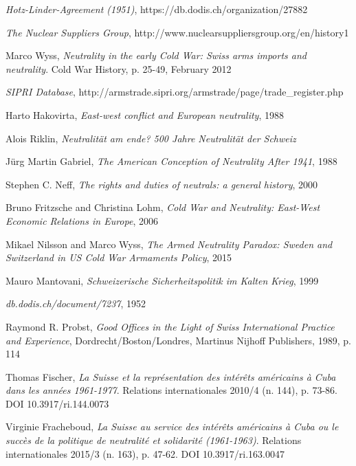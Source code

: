 \documentclass[a4paper]{article}
\begin{document}
\begin{thebibliography}{9}
\label{reference10}
\emph{Hotz-Linder-Agreement (1951)}, https://db.dodis.ch/organization/27882

\label{reference11}
\emph{The Nuclear Suppliers Group}, http://www.nuclearsuppliersgroup.org/en/history1

\label{reference12}
  Marco Wyss, \emph{Neutrality in the early Cold War: Swiss arms imports and neutrality}. Cold War History, p. 25-49, February 2012

\label{reference13}
\emph{SIPRI Database}, http://armstrade.sipri.org/armstrade/page/trade\_register.php

\label{reference14}
Harto Hakovirta, \emph{East-west conflict and European neutrality}, 1988

\label{reference15}
Alois Riklin, \emph{Neutralität am ende? 500 Jahre Neutralität der Schweiz}

\label{reference16}
J\"{u}rg Martin Gabriel, \emph{The American Conception of Neutrality After 1941}, 1988

\label{reference17}
Stephen C. Neff, \emph{The rights and duties of neutrals: a general history}, 2000

\label{reference18}
Bruno Fritzsche and Christina Lohm, \emph{Cold War and Neutrality: East-West Economic Relations in Europe}, 2006

\label{reference19}
Mikael Nilsson and Marco Wyss, \emph{The Armed Neutrality Paradox: Sweden and Switzerland in US Cold War Armaments Policy}, 2015

\label{reference20}
Mauro Mantovani, \emph{Schweizerische Sicherheitspolitik im Kalten Krieg}, 1999

\label{reference20}
\emph{db.dodis.ch/document/7237}, 1952

Raymond R. Probst, \emph{Good Offices in the Light of Swiss International Practice and Experience}, Dordrecht/Boston/Londres, Martinus Nijhoff Publishers, 1989, p. 114

  Thomas Fischer, \emph{La Suisse et la représentation des intérêts américains à Cuba dans les années 1961-1977}. Relations internationales 2010/4 (n. 144), p. 73-86. DOI 10.3917/ri.144.0073

  Virginie Fracheboud, \emph{La Suisse au service des intérêts américains à Cuba ou le succès de la politique de neutralité et solidarité (1961-1963)}. Relations internationales 2015/3 (n. 163), p. 47-62. DOI 10.3917/ri.163.0047
    

\end{thebibliography}
\end{document}
